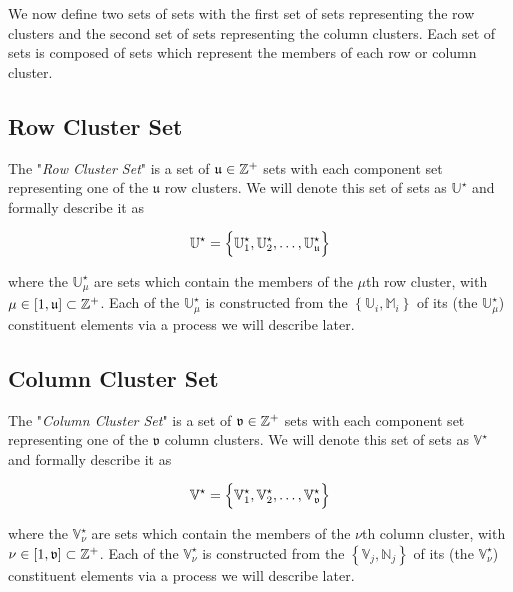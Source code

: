 \documentclass[../ClusteringConnectionsMAIN.tex]{subfiles}
\begin{document}
\begin{flushleft}
\begin{large}


We now define two sets of sets with the first set of sets representing the row clusters and the second set of sets representing the column clusters.  Each set of sets is composed of sets which represent the members of each row or column cluster.


\subsection{Row Cluster Set}

The "\emph{Row Cluster Set}" is a set of $\mathfrak{u} \in \mathbb{Z}^+$ sets with each component set representing one of the $\mathfrak{u}$ row clusters.  We will denote this set of sets as $\mathbb{U}^\star$ and formally describe it as

\begin{align*}
\mathbb{U}^\star = \Bigl\{ \mathbb{U}^\star_1, \mathbb{U}^\star_2, \dots, \mathbb{U}^\star_\mathfrak{u} \Bigr\}
\end{align*}

where the $\mathbb{U}^\star_\mu$ are sets which contain the members of the $\mu$th row cluster, with $\mu \in \left[ 1, \mathfrak{u} \right] \subset \mathbb{Z}^+$.  Each of the $\mathbb{U}^\star_\mu$ is constructed from the $\left\{ \mathbb{U}_i, \mathbb{M}_i \right\}$ of its (the $\mathbb{U}^\star_\mu$) constituent elements via a process we will describe later.


\subsection{Column Cluster Set}

The "\emph{Column Cluster Set}" is a set of $\mathfrak{v} \in \mathbb{Z}^+$ sets with each component set representing one of the $\mathfrak{v}$ column clusters.  We will denote this set of sets as $\mathbb{V}^\star$ and formally describe it as

\begin{align*}
\mathbb{V}^\star = \Bigl\{ \mathbb{V}^\star_1, \mathbb{V}^\star_2, \dots, \mathbb{V}^\star_\mathfrak{v} \Bigr\}
\end{align*}

where the $\mathbb{V}^\star_\nu$ are sets which contain the members of the $\nu$th column cluster, with $\nu \in \left[ 1, \mathfrak{v} \right] \subset \mathbb{Z}^+$.  Each of the $\mathbb{V}^\star_\nu$ is constructed from the $\left\{ \mathbb{V}_j, \mathbb{N}_j \right\}$ of its (the $\mathbb{V}^\star_\nu$) constituent elements via a process we will describe later.


\end{large}
\end{flushleft}
\end{document}
